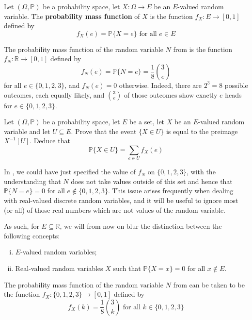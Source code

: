 \begin{definition}
\label{defPMF}
Let $(\Omega, \mathbb{P})$ be a probability space, let $X : \Omega \to E$ be an $E$-valued random variable. The \textbf{probability mass function} of $X$ is the function $f_X : E \to [0,1]$ defined by
\[ f_X(e) = \mathbb{P}\{X=e\} \text{ for all } e \in E \]
\end{definition}

\begin{example}
\label{exThreeCoinFlipsPMF}
The probability mass function of the random variable $N$ from  is the function $f_N : \mathbb{R} \to [0,1]$ defined by
\[ f_N(e) = \mathbb{P}\{N=e\} = \frac{1}{8} \binom{3}{e} \]
for all $e \in \{ 0,1,2,3 \}$, and $f_N(e)=0$ otherwise. Indeed, there are $2^3=8$ possible outcomes, each equally likely, and $\binom{3}{e}$ of those outcomes show exactly $e$ heads for $e \in \{0,1,2,3\}$.
\end{example}

\begin{exercise}
Let $(\Omega, \mathbb{P})$ be a probability space, let $E$ be a set, let $X$ be an $E$-valued random variable and let $U \subseteq E$. Prove that the event $\{X \in U\}$ is equal to the preimage $X^{-1}[U]$. Deduce that
\[ \mathbb{P}\{X \in U\} = \sum_{e \in U} f_X(e) \]
\end{exercise}

In , we could have just specified the value of $f_N$ on $\{0,1,2,3\}$, with the understanding that $N$ does not take values outside of this set and hence that $\mathbb{P}\{N=e\}=0$ for all $e \not \in \{0,1,2,3\}$. This issue arises frequently when dealing with real-valued discrete random variables, and it will be useful to ignore most (or all) of those real numbers which are not values of the random variable.

As such, for $E \subseteq \mathbb{R}$, we will from now on blur the distinction between the following concepts:
\begin{enumerate}[(i)]
\item $E$-valued random variables;
\item Real-valued random variables $X$ such that $\mathbb{P}\{X=x\}=0$ for all $x \not \in E$.
\end{enumerate}

\begin{example}
The probability mass function of the random variable $N$ from  can be taken to be the function $f_X : \{0,1,2,3\} \to [0,1]$ defined by
\[ f_X(k) = \frac{1}{8} \binom{3}{k} \text{ for all } k \in \{ 0,1,2,3\} \]
\end{example}

